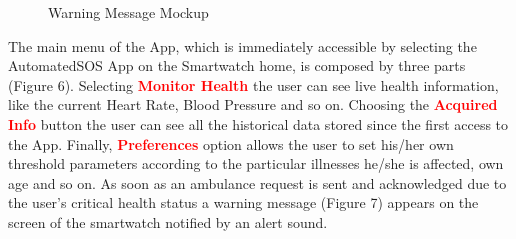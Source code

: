 \begin{enumerate}
\begin{figure}
\begin{center}
\begin{minipage}[c]{.40\textwidth}
          	\caption{Warning Message Mockup}
        \end{minipage}
      \end{center}
\end{figure}
The main menu of the App, which is immediately accessible by selecting the AutomatedSOS App on the Smartwatch home, is composed by three parts (Figure 6). Selecting {\textcolor{Red}{\textbf{Monitor Health}}} the user can see live health information, like the current Heart Rate, Blood Pressure and so on. Choosing the {\textcolor{Red}{\textbf{Acquired Info}}} button the user can see all the historical data stored since the first access to the App. Finally, {\textcolor{Red}{\textbf{Preferences}}} option allows the user to set his/her own threshold parameters according to the particular illnesses he/she is affected, own age and so on. As soon as an ambulance request is sent and acknowledged due to the user's critical health status a warning message (Figure 7) appears on the screen of the smartwatch notified by an alert sound.
\clearpage


\end{enumerate}
